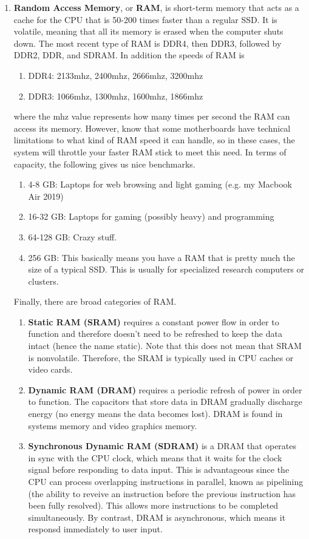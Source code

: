\documentclass{article}
\begin{document}
      \begin{enumerate}
        \item \textbf{Random Access Memory}, or \textbf{RAM}, is short-term memory that acts as a cache for the CPU that is 50-200 times faster than a regular SSD. It is volatile, meaning that all its memory is erased when the computer shuts down. The most recent type of RAM is DDR4, then DDR3, followed by DDR2, DDR, and SDRAM. In addition the speeds of RAM is 
        \begin{enumerate}
          \item DDR4: 2133mhz, 2400mhz, 2666mhz, 3200mhz
          \item DDR3: 1066mhz, 1300mhz, 1600mhz, 1866mhz
        \end{enumerate}
        where the mhz value represents how many times per second the RAM can access its memory. However, know that some motherboards have technical limitations to what kind of RAM speed it can handle, so in these cases, the system will throttle your faster RAM stick to meet this need. In terms of capacity, the following gives us nice benchmarks.
        \begin{enumerate}
          \item 4-8 GB: Laptops for web browsing and light gaming (e.g. my Macbook Air 2019)
          \item 16-32 GB: Laptops for gaming (possibly heavy) and programming
          \item 64-128 GB: Crazy stuff.
          \item 256 GB: This basically means you have a RAM that is pretty much the size of a typical SSD. This is usually for specialized research computers or clusters. 
        \end{enumerate}
        Finally, there are broad categories of RAM. 
        \begin{enumerate}
          \item \textbf{Static RAM (SRAM)} requires a constant power flow in order to function and therefore doesn't need to be refreshed to keep the data intact (hence the name static). Note that this does not mean that SRAM is nonvolatile. Therefore, the SRAM is typically used in CPU caches or video cards. 
          \item \textbf{Dynamic RAM (DRAM)} requires a periodic refresh of power in order to function. The capacitors that store data in DRAM gradually discharge energy (no energy means the data becomes lost). DRAM is found in systems memory and video graphics memory. 
          \item \textbf{Synchronous Dynamic RAM (SDRAM)} is a DRAM that operates in sync with the CPU clock, which means that it waits for the clock signal before responding to data input. This is advantageous since the CPU can process overlapping instructions in parallel, known as pipelining (the ability to reveive an instruction before the previous instruction has been fully resolved). This allows more instructions to be completed simultaneously. By contrast, DRAM is asynchronous, which means it responsd immediately to user input.
        \end{enumerate}
        

\end{enumerate}
\end{document}
